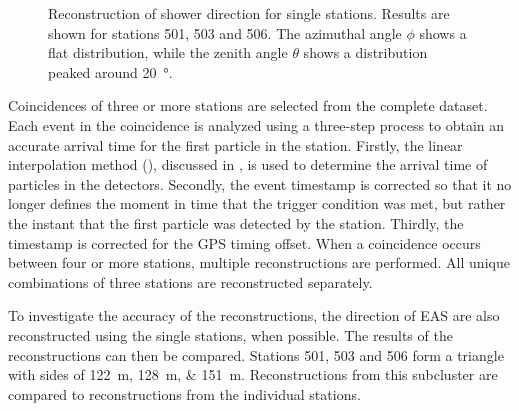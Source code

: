 \begin{figure}
\centering
{

\vspace{1cm}

}
\caption{Reconstruction of shower direction for single stations.  Results are
shown for stations 501, 503 and 506.  The azimuthal angle $\phi$ shows a
flat distribution, while the zenith angle $\theta$ shows a
distribution peaked around \SI{20}{\degree}.}
\label{fig:single-stations-hists}
\end{figure}

Coincidences of three or more stations are selected from the complete dataset.
Each event in the coincidence is analyzed using a three-step process to obtain
an accurate arrival time for the first particle in the station.
Firstly, the linear interpolation method (), discussed in
, is used to determine the arrival time of
particles in the detectors.  Secondly, the event timestamp is corrected so that it no longer
defines the moment in time that the trigger condition was met, but rather the
instant that the first particle was detected by the station.  Thirdly, the
timestamp is corrected for the GPS timing offset.  When a coincidence occurs
between four or more stations, multiple reconstructions are performed. All
unique combinations of three stations are reconstructed separately.

To investigate the accuracy of the reconstructions, the direction of EAS are
also reconstructed using the single stations, when possible.  The results of the
reconstructions can then be compared.  Stations 501, 503 and 506 form a triangle
with sides of \SIlist{122;128;151}{\meter}.  Reconstructions from this
subcluster are compared to reconstructions from the individual stations.

